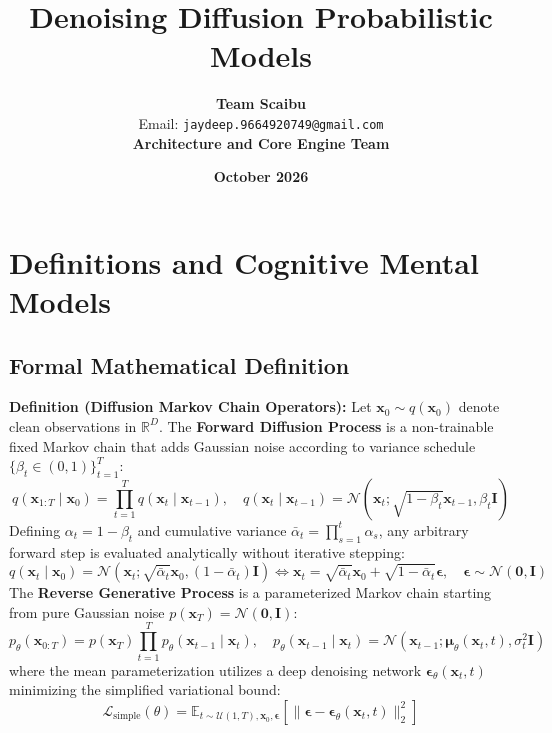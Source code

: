 \documentclass[11pt,a4paper]{article}
\title{\textbf{Denoising Diffusion Probabilistic Models}}
\author{\textbf{Team Scaibu} \\ \small Email: \texttt{jaydeep.9664920749@gmail.com} \\ \small \textbf{Architecture and Core Engine Team}}
\date{\textbf{October 2026}}
\theoremstyle{definition}
\begin{document}
\maketitle

\section{Definitions and Cognitive Mental Models}

\subsection{Formal Mathematical Definition}
\textbf{Definition (Diffusion Markov Chain Operators):}
Let $\mathbf{x}_0 \sim q(\mathbf{x}_0)$ denote clean observations in $\mathbb{R}^D$. The \textbf{Forward Diffusion Process} is a non-trainable fixed Markov chain that adds Gaussian noise according to variance schedule $\{\beta_t \in (0, 1)\}_{t=1}^T$:
{\boldmath
\begin{equation}
q(\mathbf{x}_{1:T} \mid \mathbf{x}_0) = \prod_{t=1}^T q(\mathbf{x}_t \mid \mathbf{x}_{t-1}), \quad q(\mathbf{x}_t \mid \mathbf{x}_{t-1}) = \mathcal{N}\left( \mathbf{x}_t; \sqrt{1 - \beta_t}\mathbf{x}_{t-1}, \beta_t \mathbf{I} \right)
\end{equation}
}
Defining $\alpha_t = 1 - \beta_t$ and cumulative variance $\bar{\alpha}_t = \prod_{s=1}^t \alpha_s$, any arbitrary forward step is evaluated analytically without iterative stepping:
{\boldmath
\begin{equation}
q(\mathbf{x}_t \mid \mathbf{x}_0) = \mathcal{N}\left( \mathbf{x}_t; \sqrt{\bar{\alpha}_t}\mathbf{x}_0, (1 - \bar{\alpha}_t)\mathbf{I} \right) \Longleftrightarrow \mathbf{x}_t = \sqrt{\bar{\alpha}_t}\mathbf{x}_0 + \sqrt{1 - \bar{\alpha}_t}\boldsymbol{\epsilon}, \quad \boldsymbol{\epsilon} \sim \mathcal{N}(\mathbf{0}, \mathbf{I})
\end{equation}
}
The \textbf{Reverse Generative Process} is a parameterized Markov chain starting from pure Gaussian noise $p(\mathbf{x}_T) = \mathcal{N}(\mathbf{0}, \mathbf{I})$:
{\boldmath
\begin{equation}
p_\theta(\mathbf{x}_{0:T}) = p(\mathbf{x}_T) \prod_{t=1}^T p_\theta(\mathbf{x}_{t-1} \mid \mathbf{x}_t), \quad p_\theta(\mathbf{x}_{t-1} \mid \mathbf{x}_t) = \mathcal{N}\left( \mathbf{x}_{t-1}; \boldsymbol{\mu}_\theta(\mathbf{x}_t, t), \sigma_t^2 \mathbf{I} \right)
\end{equation}
}
where the mean parameterization utilizes a deep denoising network $\boldsymbol{\epsilon}_\theta(\mathbf{x}_t, t)$ minimizing the simplified variational bound:
{\boldmath
\begin{equation}
\mathcal{L}_{\text{simple}}(\theta) = \mathbb{E}_{t \sim \mathcal{U}(1, T), \mathbf{x}_0, \boldsymbol{\epsilon}}\left[ \|\boldsymbol{\epsilon} - \boldsymbol{\epsilon}_\theta(\mathbf{x}_t, t)\|_2^2 \right]
\end{equation}
}
\end{document}
